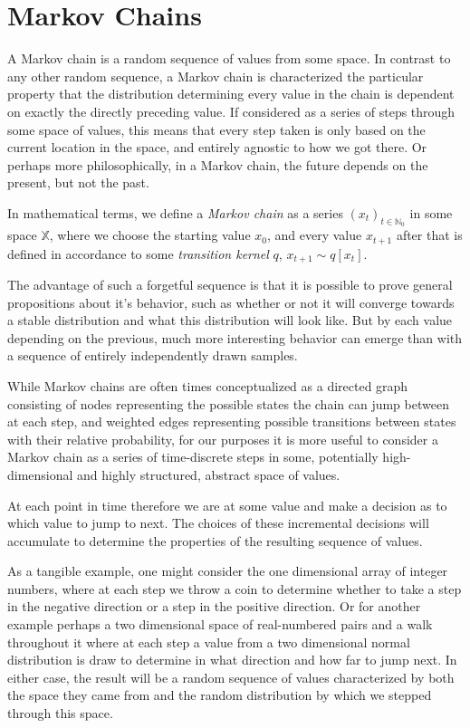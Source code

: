 \section{Markov Chains}

A Markov chain is a random sequence of values from some space. In contrast to any other random sequence, a Markov chain is characterized the particular property that the distribution determining every value in the chain is dependent on exactly the directly preceding value. If considered as a series of steps through some space of values, this means that every step taken is only based on the current location in the space, and entirely agnostic to how we got there. Or perhaps more philosophically, in a Markov chain, the future depends on the present, but not the past.

In mathematical terms, we define a \textit{Markov chain} as a series $(x_t)_{t \in \mathbb{N}_0}$ in some space $\mathbb{X}$, where we choose the starting value $x_0$, and every value $x_{t + 1}$ after that is defined in accordance to some \textit{transition kernel} $q$, $x_{t+1} \sim q[x_t]$.

The advantage of such a forgetful sequence is that it is possible to prove general propositions about it's behavior, such as whether or not it will converge towards a stable distribution and what this distribution will look like. But by each value depending on the previous, much more interesting behavior can emerge than with a sequence of entirely independently drawn samples.

While Markov chains are often times conceptualized as a directed graph consisting of nodes representing the possible states the chain can jump between at each step, and weighted edges representing possible transitions between states with their relative probability, for our purposes it is more useful to consider a Markov chain as a series of time-discrete steps in some, potentially high-dimensional and highly structured, abstract space of values.

At each point in time therefore we are at some value and make a decision as to which value to jump to next. The choices of these incremental decisions will accumulate to determine the properties of the resulting sequence of values.

As a tangible example, one might consider the one dimensional array of integer numbers, where at each step we throw a coin to determine whether to take a step in the negative direction or a step in the positive direction. Or for another example perhaps a two dimensional space of real-numbered pairs and a walk throughout it where at each step a value from a two dimensional normal distribution is draw to determine in what direction and how far to jump next. In either case, the result will be a random sequence of values characterized by both the space they came from and the random distribution by which we stepped through this space.

